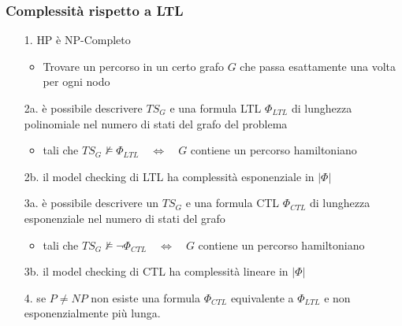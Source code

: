 \begin{frame}
  \frametitle{Complessit\`a rispetto a \acf{LTL}}
  \begin{itemize}
  \item[1.] \ac{HP} \`e \alert{NP-Completo}
    \begin{itemize}
    \item Trovare un percorso in un certo grafo $G$ che passa
      esattamente una volta per ogni nodo
    \end{itemize}
  \item[2a.] \`e possibile descrivere $TS_G$ e una formula
    \alert{\acs{LTL}} $\Phi_{LTL}$ di
    lunghezza \alert{polinomiale} nel numero di stati del grafo del problema
    \begin{itemize}
    \item  tali che
      $TS_G\not\models\Phi_{LTL}\quad\Leftrightarrow\quad G$
      contiene un percorso hamiltoniano
    \end{itemize}
  \item[2b.] il model checking di \ac{LTL} ha complessit\`a \alert{esponenziale} in $|\Phi|$
  \item[3a.] \`e possibile descrivere un $TS_G$ e una formula
    \alert{\ac{CTL}} $\Phi_{CTL}$ di lunghezza \alert{esponenziale} nel numero di
    stati del grafo
    \begin{itemize}
    \item  tali che
      $TS_G\not\models\neg\Phi_{CTL}\quad\Leftrightarrow\quad G$
      contiene un percorso hamiltoniano
    \end{itemize}
  \item[3b.] il model checking di \ac{CTL} ha complessit\`a \alert{lineare} in $|\Phi|$
  \item[4.] se $P\neq NP$ \alert{non} esiste una formula $\Phi_{CTL}$ equivalente
    a $\Phi_{LTL}$ e \alert{non} esponenzialmente pi\`u lunga.
  \end{itemize}
\end{frame}

